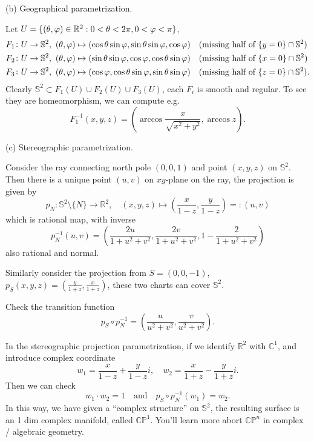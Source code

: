 \noindent (b) Geographical parametrization.

Let \(U=\{(\theta,\varphi)\in \mathbb{R}^2:0<\theta<2\pi,0<\varphi<\pi\}\), 
\begin{align*}
    &F_1\colon U\to \mathbb{S}^2,\ (\theta,\varphi)\mapsto 
    (\cos\theta\sin\varphi,\sin\theta\sin\varphi,\cos\varphi)
    \quad\text{(missing half of }\{y=0\}\cap \mathbb{S}^2\text{)}\\ 
    &F_2\colon U\to \mathbb{S}^2,\ (\theta,\varphi)\mapsto 
    (\sin\theta\sin\varphi,\cos\varphi,\cos\theta\sin\varphi)
    \quad\text{(missing half of }\{x=0\}\cap \mathbb{S}^2\text{)}\\ 
    &F_3\colon U\to \mathbb{S}^2,\ (\theta,\varphi)\mapsto 
    (\cos\varphi,\cos\theta\sin\varphi,\sin\theta\sin\varphi)
    \quad\text{(missing half of }\{z=0\}\cap \mathbb{S}^2\text{)}
.\end{align*}
Clearly \(\mathbb{S}^2\subset F_1(U)\cup F_2(U)\cup F_3(U)\), each \(F_i\) is smooth
and regular. To see they are homeomorphism, we can compute e.g. \[
    F_1^{-1}(x,y,z)=(\arccos \frac{x}{\sqrt{x^2+y^2}}, \arccos z)
.\] 

\noindent (c) Stereographic parametrization.

Consider the ray connecting north pole \((0,0,1)\) and point \((x,y,z)\) on
\(\mathbb{S}^2\). Then there is a unique point \((u,v)\) on \(xy\)-plane on the
ray, the projection is given by \[
    p_N\colon \mathbb{S}^2\setminus\{N\}\to \mathbb{R}^2,
    \quad (x,y,z)\mapsto (\frac{x}{1-z},\frac{y}{1-z})=\colon(u,v)
\] which is rational map, with inverse \[
    p_N^{-1}(u,v)=(\frac{2u}{1+u^2+v^2},\frac{2v}{1+u^2+v^2},1-\frac{2}{1+u^2+v^2})
\] also rational and normal.

Similarly consider the projection from \(S=(0,0,-1)\), \(p_S(x,y,z)=(\frac{y}{1+z},
\frac{x}{1+z})\), these two charts can cover \(\mathbb{S}^2\).

\begin{exercise}
    Check the transition function \[
        p_S\circ p_N^{-1}=(\frac{u}{u^2+v^2},\frac{v}{u^2+v^2})
    .\] 
\end{exercise}

\begin{remark}
    In the stereographic projection parametrization, if we identify \(\mathbb{R}^2\)
    with \(\mathbb{C}^1\), and introduce complex coordinate \[
        w_1=\frac{x}{1-z}+\frac{y}{1-z}i,\quad
        w_2=\frac{x}{1+z}-\frac{y}{1+z}i
    .\] Then we can check \[
        w_1\cdot w_2=1\quad \text{and} \quad
        p_S\circ p_N^{-1}(w_1)=w_2
    .\] In this way, we have given a ``complex structure'' on \(\mathbb{S}^2\),
    the resulting surface is an 1 dim complex manifold, called \(\mathbb{CP}^1\).
    You'll learn more abort \(\mathbb{CP}^n\) in complex / algebraic geometry.
\end{remark}


